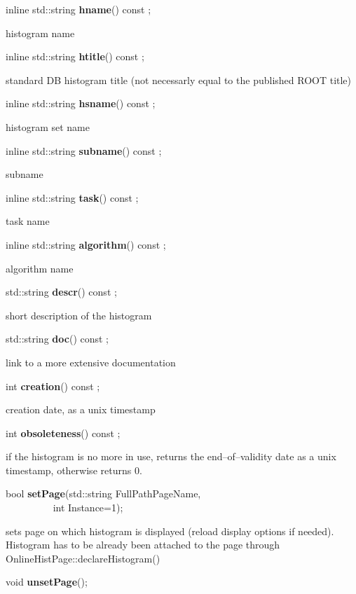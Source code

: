 \item    inline std::string {\bf hname}() const ;

 histogram name


\item    inline std::string {\bf htitle}() const ;

 standard DB histogram title (not necessarly equal to the published ROOT title)


\item    inline std::string {\bf hsname}() const ;

 histogram set name


\item    inline std::string {\bf subname}() const ;

 subname


\item    inline std::string {\bf task}() const ;

 task name


\item    inline std::string {\bf algorithm}() const ;

 algorithm name


\item    std::string {\bf descr}() const ;

 short description of the histogram


\item    std::string {\bf doc}() const ;

 link to a more extensive documentation


\item    int {\bf creation}() const ;

 creation date, as a unix timestamp


\item    int {\bf obsoleteness}() const ;

 if the histogram is no more in use, returns the end--of--validity date
 as a unix timestamp, otherwise returns 0.


\item    bool {\bf setPage}(std::string FullPathPageName,\\\mbox{}~~~~~~~~~
	       int Instance=1);

 sets page on which histogram is displayed (reload display options if needed). Histogram has to be already
 been attached to the page through OnlineHistPage::declareHistogram()


\item    void {\bf unsetPage}();


